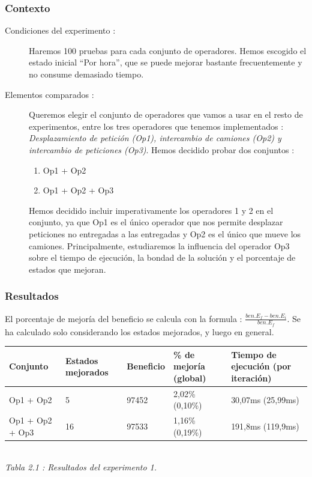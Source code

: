\documentclass{article}
\begin{document}
\subsubsection{Contexto}

\begin{description}
\item[Condiciones del experimento :] Haremos 100 pruebas para cada conjunto de
operadores. Hemos escogido el estado inicial ``Por hora'', que se puede mejorar
bastante frecuentemente y no consume demasiado tiempo.
\item[Elementos comparados :] Queremos elegir el conjunto de operadores que
vamos a usar en el resto de experimentos, entre los tres operadores que tenemos
implementados : \emph{Desplazamiento de petición (Op1), intercambio de camiones
(Op2) y intercambio de peticiones (Op3)}. Hemos decidido probar dos conjuntos :
\begin{enumerate}
\item Op1 + Op2
\item Op1 + Op2 + Op3
\end{enumerate}
Hemos decidido incluir imperativamente los operadores 1 y 2 en el conjunto, ya
que Op1 es el único operador que nos permite desplazar peticiones no entregadas
a las entregadas y Op2 es el único que mueve los camiones. Principalmente,
estudiaremos la influencia del operador Op3 sobre el tiempo de ejecución, la
bondad de la solución y el porcentaje de estados que mejoran.
\end{description}

\subsubsection{Resultados}

El porcentaje de mejoría del beneficio se calcula con la formula :
$\frac{ben. E_f - ben. E_i}{ben. E_f}$. Se ha calculado solo considerando los
estados mejorados, y luego en general.

\begin{center}
\begin{tabular}{|l|l|l|l|l|}
\hline
Conjunto & Estados mejorados & Beneficio &  \% de mejoría (global) & Tiempo de
ejecución (por iteración)\\
\hline
Op1 + Op2 & 5 & 97452 & 2,02\% (0,10\%) & 30,07ms (25,99ms)\\
\hline
Op1 + Op2 + Op3 & 16 & 97533 & 1,16\% (0,19\%) & 191,8ms (119,9ms)\\
\hline
\end{tabular}\\
{\it Tabla 2.1 : Resultados del experimento 1.}
\end{center}
\end{document}
